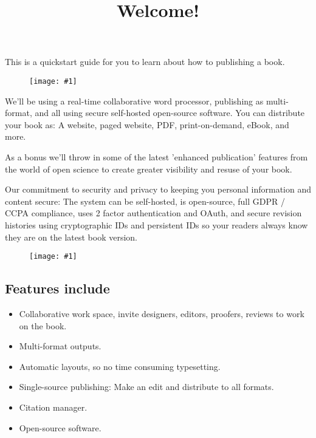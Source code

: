 \documentclass{article}
\newlength{\imgwidth}
\newcommand\scaledgraphics[2]{%
                
\settowidth{\imgwidth}{\texttt{[image: \#1]}}%
                
\setlength{\imgwidth}{\minof{\imgwidth}{#2\textwidth}}%
                
\texttt{[image: \#1]}%
                
}
\begin{document}
\title{Welcome!}

\maketitle


This is a quickstart guide for you to learn about how to publishing a book.

\begin{figure}
\scaledgraphics{b3bc6ba5-db38-4ec8-89db-45c029fdb485.png}{1}
\label{F98934631}
\end{figure}


We'll be using a real-time collaborative word processor, publishing as multi-format, and all using secure self-hosted open-source software. You can distribute your book as: A website, paged website, PDF, print-on-demand, eBook, and more.


As a bonus we'll throw in some of the latest 'enhanced publication' features from the world of open science to create greater visibility and resuse of your book.


Our commitment to security and privacy to keeping you personal information and content secure: The system can be self-hosted, is open-source, full GDPR / CCPA compliance, uses 2 factor authentication and OAuth, and secure revision histories using cryptographic IDs and persistent IDs so your readers always know they are on the latest book version. 

\begin{figure}
\scaledgraphics{60a0cd01-c4e1-467e-a517-a5ae77dbbbaf.png}{0.5}
\label{F45597451}
\end{figure}


\subsection{Features include}\label{H2087393}


\begin{itemize}
\item Collaborative work space, invite designers, editors, proofers, reviews to work on the book.


\item Multi-format outputs.


\item Automatic layouts, so no time consuming typesetting.


\item Single-source publishing: Make an edit and distribute to all formats.


\item Citation manager.


\item Open-source software.


\end{itemize}
\end{document}
